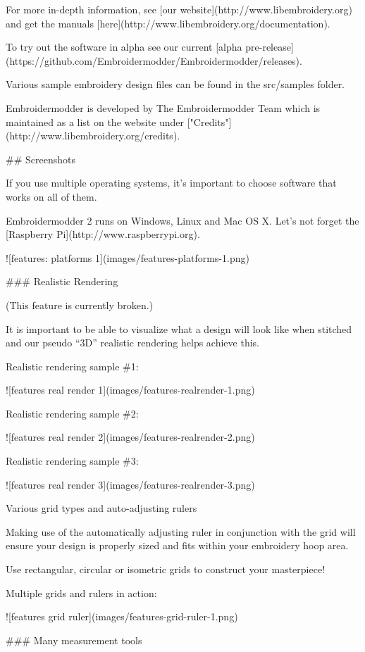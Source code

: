 For more in-depth information, see [our website](http://www.libembroidery.org)
and get the manuals [here](http://www.libembroidery.org/documentation).

To try out the software in alpha see our current
[alpha pre-release](https://github.com/Embroidermodder/Embroidermodder/releases).

Various sample embroidery design files can be found in
the src/samples folder.

Embroidermodder is developed by The Embroidermodder Team which is maintained as a
list on the website under ["Credits"](http://www.libembroidery.org/credits).

## Screenshots

If you use multiple operating systems, it's important to choose software that works on all of them.

Embroidermodder 2 runs on Windows, Linux and Mac OS X. Let's not forget the [Raspberry
Pi](http://www.raspberrypi.org).

![features: platforms 1](images/features-platforms-1.png)

### Realistic Rendering

(This feature is currently broken.)

It is important to be able to visualize what a design will look like when stitched and our
pseudo ``3D'' realistic rendering helps achieve this.

Realistic rendering sample \#1:

![features real render 1](images/features-realrender-1.png)

Realistic rendering sample \#2:

![features real render 2](images/features-realrender-2.png)

Realistic rendering sample \#3:

![features real render 3](images/features-realrender-3.png)

Various grid types and auto-adjusting rulers

Making use of the automatically adjusting ruler in conjunction with the grid will ensure your
design is properly sized and fits within your embroidery hoop area.

Use rectangular, circular or isometric grids to construct your masterpiece!

Multiple grids and rulers in action:

![features grid ruler](images/features-grid-ruler-1.png)

### Many measurement tools

